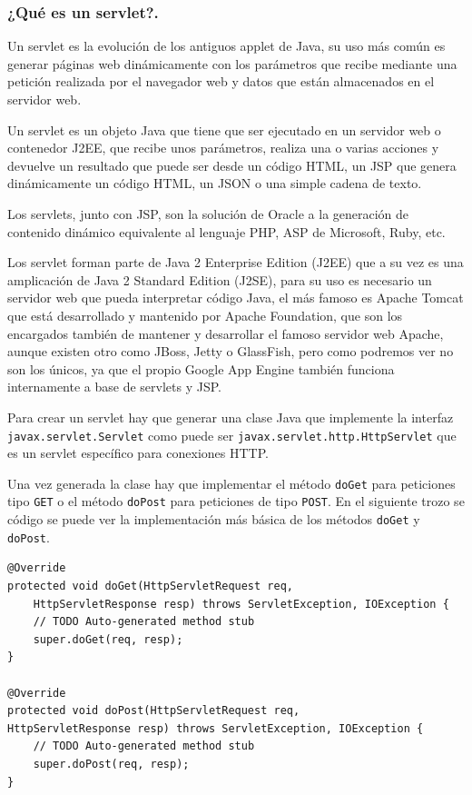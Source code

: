 \begin{itemize}
\subsubsection{¿Qué es un servlet?.}
Un servlet es la evolución de los antiguos applet de Java, su uso más común es generar páginas web dinámicamente con los parámetros que recibe mediante una petición realizada por el navegador web y datos que están almacenados en el servidor web.

Un servlet es un objeto Java que tiene que ser ejecutado en un servidor web o contenedor J2EE, que recibe unos parámetros, realiza una o varias acciones y devuelve un resultado que puede ser desde un código HTML, un JSP que genera dinámicamente un código HTML, un JSON o una simple cadena de texto.

Los servlets, junto con JSP, son la solución de Oracle a la generación de contenido dinámico equivalente al lenguaje PHP, ASP de Microsoft, Ruby, etc.

Los servlet forman parte de Java 2 Enterprise Edition (J2EE) que a su vez es una amplicación de Java 2 Standard Edition (J2SE), para su uso es necesario un servidor web que pueda interpretar código Java, el más famoso es Apache Tomcat que está desarrollado y mantenido por Apache Foundation, que son los encargados también de mantener y desarrollar el famoso servidor web Apache, aunque existen otro como JBoss, Jetty o GlassFish, pero como podremos ver no son los únicos, ya que el propio Google App Engine también funciona internamente a base de servlets y JSP.

Para crear un servlet hay que generar una clase Java que implemente la interfaz \lstinline{javax.servlet.Servlet} como puede ser \lstinline{javax.servlet.http.HttpServlet} que es un servlet específico para conexiones HTTP.
 
Una vez generada la clase hay que implementar el método \lstinline{doGet} para peticiones tipo \lstinline{GET} o el método \lstinline{doPost} para peticiones de tipo \lstinline{POST}. En el siguiente trozo se código se puede ver la implementación más básica de los métodos \lstinline{doGet} y \lstinline{doPost}.

\begin{lstlisting}[style=Java] 
@Override
protected void doGet(HttpServletRequest req, 
	HttpServletResponse resp) throws ServletException, IOException {
	// TODO Auto-generated method stub
	super.doGet(req, resp);
}

@Override
protected void doPost(HttpServletRequest req, 
HttpServletResponse resp) throws ServletException, IOException {
	// TODO Auto-generated method stub
	super.doPost(req, resp);
}
\end{lstlisting}


\end{itemize}
